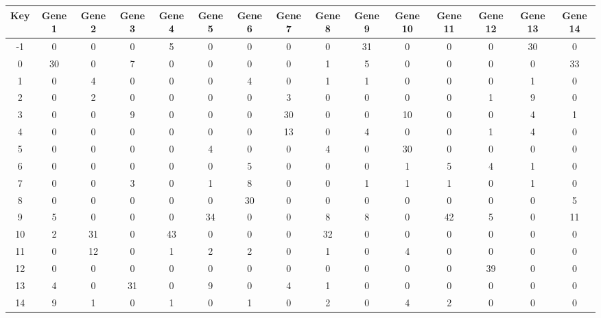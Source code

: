 \begin{tabular}{|c|c|c|c|c|c|c|c|c|c|c|c|c|c|c|}
\hline
Key & Gene 1 & Gene 2 & Gene 3 & Gene 4 & Gene 5 & Gene 6 & Gene 7 & Gene 8 & Gene 9 & Gene 10 & Gene 11 & Gene 12 & Gene 13 & Gene 14 \\
\hline
-1 & 0 & 0 & 0 & 5 & 0 & 0 & 0 & 0 & 31 & 0 & 0 & 0 & 30 & 0 \\
0 & 30 & 0 & 7 & 0 & 0 & 0 & 0 & 1 & 5 & 0 & 0 & 0 & 0 & 33 \\
1 & 0 & 4 & 0 & 0 & 0 & 4 & 0 & 1 & 1 & 0 & 0 & 0 & 1 & 0 \\
2 & 0 & 2 & 0 & 0 & 0 & 0 & 3 & 0 & 0 & 0 & 0 & 1 & 9 & 0 \\
3 & 0 & 0 & 9 & 0 & 0 & 0 & 30 & 0 & 0 & 10 & 0 & 0 & 4 & 1 \\
4 & 0 & 0 & 0 & 0 & 0 & 0 & 13 & 0 & 4 & 0 & 0 & 1 & 4 & 0 \\
5 & 0 & 0 & 0 & 0 & 4 & 0 & 0 & 4 & 0 & 30 & 0 & 0 & 0 & 0 \\
6 & 0 & 0 & 0 & 0 & 0 & 5 & 0 & 0 & 0 & 1 & 5 & 4 & 1 & 0 \\
7 & 0 & 0 & 3 & 0 & 1 & 8 & 0 & 0 & 1 & 1 & 1 & 0 & 1 & 0 \\
8 & 0 & 0 & 0 & 0 & 0 & 30 & 0 & 0 & 0 & 0 & 0 & 0 & 0 & 5 \\
9 & 5 & 0 & 0 & 0 & 34 & 0 & 0 & 8 & 8 & 0 & 42 & 5 & 0 & 11 \\
10 & 2 & 31 & 0 & 43 & 0 & 0 & 0 & 32 & 0 & 0 & 0 & 0 & 0 & 0 \\
11 & 0 & 12 & 0 & 1 & 2 & 2 & 0 & 1 & 0 & 4 & 0 & 0 & 0 & 0 \\
12 & 0 & 0 & 0 & 0 & 0 & 0 & 0 & 0 & 0 & 0 & 0 & 39 & 0 & 0 \\
13 & 4 & 0 & 31 & 0 & 9 & 0 & 4 & 1 & 0 & 0 & 0 & 0 & 0 & 0 \\
14 & 9 & 1 & 0 & 1 & 0 & 1 & 0 & 2 & 0 & 4 & 2 & 0 & 0 & 0 \\
\hline
\end{tabular}